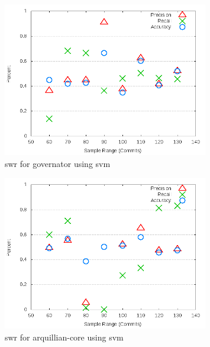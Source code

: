 \begin{figure}[!t]
\centering
\includegraphics[width=0.8\textwidth]{images/svm/test_1/governator_sample_range.png}
\caption{\gls{swr} for governator using \gls{svm}}
\label{fig:test_1_governator_svm}
\end{figure}

\begin{figure}[!t]
\centering
\includegraphics[width=0.8\textwidth]{images/svm/test_1/arquillian-core_sample_range.png}
\caption{\gls{swr} for arquillian-core using \gls{svm}}
\label{fig:test_1_arquillian-core_svm}
\end{figure}

